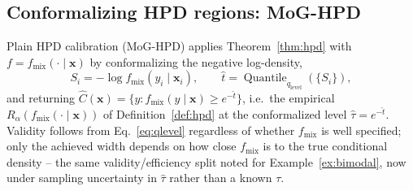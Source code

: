 \documentclass[10pt,twocolumn,a4paper]{article}
\begin{document}
\subsection{Conformalizing HPD regions: MoG-HPD}
Plain HPD calibration (MoG-HPD) applies Theorem~\ref{thm:hpd} with $f = f_{\mathrm{mix}}(\cdot\mid\bm x)$
by conformalizing the negative log-density,
\begin{equation}
S_i = -\log f_{\mathrm{mix}}(y_i\mid\bm x_i), \qquad \hat t = \operatorname{Quantile}_{q_{\mathrm{level}}}(\{S_i\}),
\end{equation}
and returning $\hat C(\bm x) = \{y: f_{\mathrm{mix}}(y\mid\bm x)\ge e^{-\hat t}\}$, i.e.\ the empirical
$R_{\alpha}(f_{\mathrm{mix}}(\cdot\mid\bm x))$ of Definition~\ref{def:hpd} at the conformalized level
$\hat\tau=e^{-\hat t}$. Validity follows from Eq.~\eqref{eq:qlevel} regardless of whether
$f_{\mathrm{mix}}$ is well specified; only the achieved width depends on how close $f_{\mathrm{mix}}$
is to the true conditional density -- the same validity/efficiency split noted for
Example~\ref{ex:bimodal}, now under sampling uncertainty in $\hat\tau$ rather than a known $\tau$.
\end{document}
